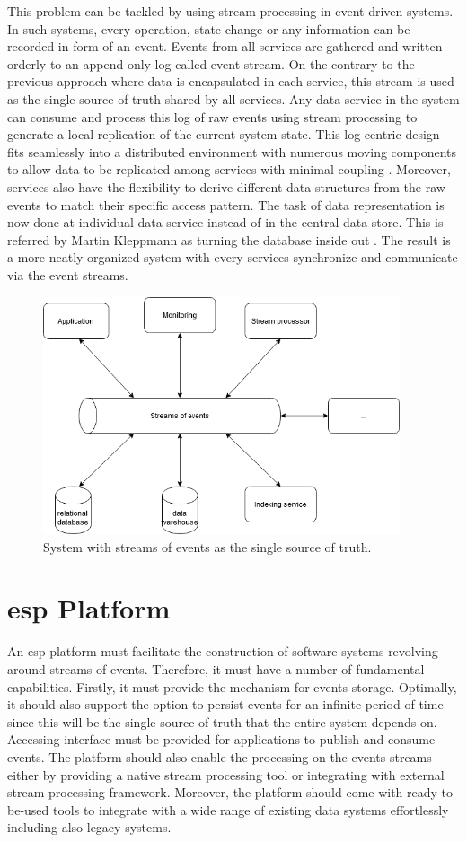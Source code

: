 This problem can be tackled by using stream processing in event-driven systems. In such systems, every operation, state change or any information can be recorded in form of an event. Events from all services are gathered and written orderly to an append-only log called event stream. On the contrary to the previous approach where data is encapsulated in each service, this stream is used as the single source of truth shared by all services. Any data service in the system can consume and process this log of raw events using stream processing to generate a local replication of the current system state. This log-centric design fits seamlessly into a distributed environment with numerous moving components to allow data to be replicated among services with minimal coupling \cite{logjaykreps}. Moreover, services also have the flexibility to derive different data structures from the raw events to match their specific access pattern. The task of data representation is now done at individual data service instead of in the central data store. This is referred by Martin Kleppmann as turning the database inside out \cite{kleppmann2016making}. The result is a more neatly organized system with every services synchronize and communicate via the event streams.

\begin{figure}[h]
	\includegraphics[width=\linewidth,height=7cm]{images/eventstreamprocessing.png}
	\caption{System with streams of events as the single source of truth.}
	\label{fig:eventstreamprocessingsystem}
\end{figure}

\section{\acrlong{esp} Platform}
An \acrlong{esp} platform must facilitate the construction of software systems revolving around streams of events. Therefore, it must have a number of fundamental capabilities. Firstly, it must provide the mechanism for events storage. Optimally, it should also support the option to persist events for an infinite period of time since this will be the single source of truth that the entire system depends on. Accessing interface must be provided for applications to publish and consume events. The platform should also enable the processing on the events streams either by providing a native stream processing tool or integrating with external stream processing framework. Moreover, the platform should come with ready-to-be-used tools to integrate with a wide range of existing data systems effortlessly including also legacy systems.

